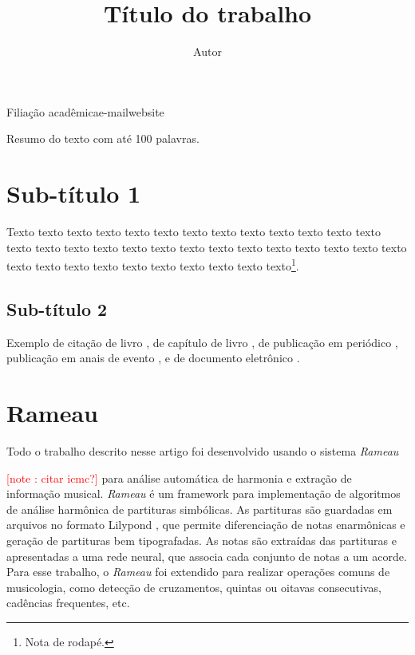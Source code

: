 \documentclass{article}
\newcounter{notecounter}
\newcommand{\note}[1]{
  \addtocounter{notecounter}{1}
  \textcolor{red}{[note \arabic{notecounter}: #1]}
}
\newcommand{\rameau}{\textit{Rameau}}
\begin{document}
\graphicspath{{figs-out/}{out/}}


\title{Título do trabalho}
\author{Autor}{Filiação acadêmica}{e-mail}{website}

\begin{sumario}
  Resumo do texto com até 100 palavras.  
\end{sumario}



\section{Sub-título 1}
\label{sec:sub-titulo-1}

Texto texto texto texto texto texto texto texto texto texto texto
texto texto texto texto texto texto texto texto texto texto texto
texto texto texto texto texto texto texto texto texto texto texto
texto texto texto texto\footnote{Nota de rodapé.}.

\subsection{Sub-título 2}
\label{sec:sub-titulo-2}

Exemplo de citação de livro \cite{turabian96:manual}, de capítulo de
livro \cite[275]{kliewer75:aspects}, de publicação em periódico
\cite{forte02:olivier}, publicação em anais de evento
\cite{kroger.ea06:processo}, e de documento eletrônico .


\section{Rameau}
\label{sec:rameau}

Todo o trabalho descrito nesse artigo foi desenvolvido usando o
sistema \rameau{} \note{citar icmc?} para análise automática de harmonia
e extração de informação musical. \rameau{}  é um framework para
implementação de algoritmos de análise harmônica de partituras
simbólicas. As partituras são guardadas em arquivos no formato
Lilypond \cite{nienhuys.ea08:lilypond}, que permite diferenciação de
notas enarmônicas e geração de partituras bem tipografadas. As notas
são extraídas das partituras e apresentadas a uma rede neural, que
associa cada conjunto de notas a um acorde.  Para esse trabalho, o
\rameau{}  foi extendido para realizar operações comuns de musicologia,
como detecção de cruzamentos, quintas ou oitavas consecutivas,
cadências frequentes, etc.
\end{document}
